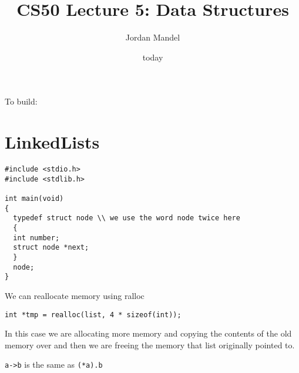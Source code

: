 \documentclass[
]{article}
\title{CS50 Lecture 5: Data Structures}
\author{Jordan Mandel}
\date{today}
\begin{document}
\maketitle

To build:

\hypertarget{linkedlists}{%
\section{LinkedLists}\label{linkedlists}}

\begin{verbatim}
#include <stdio.h>
#include <stdlib.h>

int main(void)
{
  typedef struct node \\ we use the word node twice here
  {
  int number;
  struct node *next;
  }
  node;
}
\end{verbatim}

We can reallocate memory using ralloc

\begin{verbatim}
int *tmp = realloc(list, 4 * sizeof(int));
\end{verbatim}

In this case we are allocating more memory and copying the contents of
the old memory over and then we are freeing the memory that list
originally pointed to.

\texttt{a-\textgreater{}b} is the same as \texttt{(*a).b}
\end{document}
